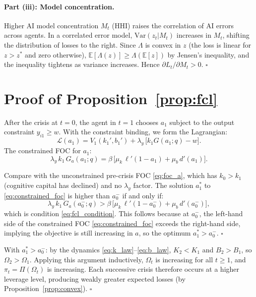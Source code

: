 \documentclass[12pt]{article}
\newcommand{\E}{\mathbb{E}}
\begin{document}
\paragraph{Part (iii): Model concentration.}

Higher AI model concentration $M_t$ (HHI) raises the correlation of AI errors across
agents. In a correlated error model, $\text{Var}(z_t | M_t)$ increases in $M_t$,
shifting the distribution of losses to the right. Since $\Lambda$ is convex in $z$
(the loss is linear for $z > z^*$ and zero otherwise), $\E[\Lambda(z)] \geq \Lambda(\E[z])$
by Jensen's inequality, and the inequality tightens as variance increases.
Hence $\partial L_t / \partial M_t > 0$. $\square$

\section{Proof of Proposition~\ref{prop:fcl}}
\label{app:prop4}

After the crisis at $t=0$, the agent in $t=1$ chooses $a_1$ subject to the output
constraint $y_{i1} \geq w$. With the constraint binding, we form the Lagrangian:
\[
\mathcal{L}(a_1) = V_1(k_1', b_1') + \lambda_y\,\bigl[k_1 G(a_1; q) - w\bigr].
\]
The constrained FOC for $a_1$:
\begin{equation}
\lambda_y\, k_1\, G_a(a_1; q) = \beta\,\bigl[\mu_k\,\ell'(1-a_1) + \mu_b\,d'(a_1)\bigr].
\label{eq:constrained_foc}
\end{equation}

Compare with the unconstrained pre-crisis FOC \eqref{eq:foc_a}, which has $k_0 > k_1$
(cognitive capital has declined) and no $\lambda_y$ factor.
The solution $a_1^*$ to \eqref{eq:constrained_foc} is higher than $a_0^-$ if and only if:
\[
\lambda_y\, k_1\, G_a(a_0^-; q) > \beta\,\bigl[\mu_k\,\ell'(1-a_0^-) + \mu_b\,d'(a_0^-)\bigr],
\]
which is condition \eqref{eq:fcl_condition}. This follows because at $a_0^-$, the left-hand side of the constrained FOC \eqref{eq:constrained_foc} exceeds the right-hand side, implying the objective is still increasing in $a$, so the optimum $a_1^* > a_0^-$. $\square$

With $a_1^* > a_0^-$: by the dynamics \eqref{eq:k_law}--\eqref{eq:b_law},
$K_2 < K_1$ and $B_2 > B_1$, so $\Omega_2 > \Omega_1$.
Applying this argument inductively, $\Omega_t$ is increasing for all $t \geq 1$,
and $\pi_t = \Pi(\Omega_t)$ is increasing. Each successive crisis therefore occurs
at a higher leverage level, producing weakly greater expected losses
(by Proposition~\ref{prop:convex}). $\square$
\end{document}

